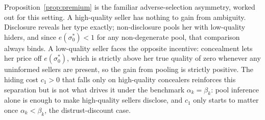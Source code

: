 Proposition~\ref{prop:premium} is the familiar adverse-selection asymmetry, worked out for this setting. A high-quality seller has nothing to gain from ambiguity. Disclosure reveals her type exactly; non-disclosure pools her with low-quality hiders, and since $e(\sigma_0^*)<1$ for any non-degenerate pool, that comparison always binds. A low-quality seller faces the opposite incentive: concealment lets her price off $e(\sigma_0^*)$, which is strictly above her true quality of zero whenever any uninformed sellers are present, so the gain from pooling is strictly positive. The hiding cost $c_1>0$ that falls only on high-quality concealers reinforces this separation but is not what drives it under the benchmark $\alpha_k=\beta_k$: pool inference alone is enough to make high-quality sellers disclose, and $c_1$ only starts to matter once $\alpha_k<\beta_k$, the distrust-discount case.
